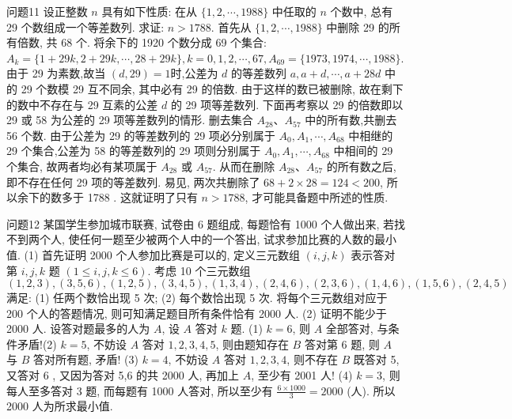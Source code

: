 问题11 设正整数 $n$ 具有如下性质: 在从 $\{1,2, \cdots, 1988\}$ 中任取的 $n$ 个数中, 总有 29 个数组成一个等差数列.
求证: $n>1788$.
首先从 $\{1,2, \cdots, 1988\}$ 中删除 29 的所有倍数, 共 68 个.
将余下的 1920 个数分成 69 个集合: $A_k=\{1+29 k, 2+29 k, \cdots, 28+29 k\}, k=0,1,2, \cdots, 67, A_{69}=\{1973,1974, \cdots, 1988\}$. 由于 29 为素数,故当 $(d, 29)=1 $时,公差为 $d$ 的等差数列 $a, a+d, \cdots, a+28 d$ 中的 29 个数模 29 互不同余, 其中必有 29 的倍数.
由于这样的数已被删除, 故在剩下的数中不存在与 29 互素的公差 $d$ 的 29 项等差数列.
下面再考察以 29 的倍数即以 29 或 58 为公差的 29 项等差数列的情形.
删去集合 $A_{28} 、 A_{57}$ 中的所有数,共删去 56 个数.
由于公差为 29 的等差数列的 29 项必分别属于 $A_0, A_1, \cdots, A_{68}$ 中相继的 29 个集合,公差为 58 的等差数列的 29 项则分别属于 $A_0, A_1, \cdots, A_{68}$ 中相间的 29 个集合, 故两者均必有某项属于 $A_{28}$ 或 $A_{57}$. 从而在删除 $A_{28} 、 A_{57}$ 的所有数之后, 即不存在任何 29 项的等差数列.
易见, 两次共删除了 $68+2 \times 28=124<200$, 所以余下的数多于 1788 . 这就证明了只有 $n>1788$, 才可能具备题中所述的性质.



问题12 某国学生参加城市联赛, 试卷由 6 题组成, 每题恰有 1000 个人做出来, 若找不到两个人, 使任何一题至少被两个人中的一个答出, 试求参加比赛的人数的最小值.
(1) 首先证明 2000 个人参加比赛是可以的, 定义三元数组 $(i, j, k)$ 表示答对第 $i, j, k$ 题 $(1 \leqslant i, j, k \leqslant 6)$. 考虑 10 个三元数组 $(1,2,3),(3,5,6),(1,2,5),(3,4,5),(1,3,4),(2,4,6),(2,3,6),(1,4,6),(1,5,6),(2,4,5)$ 满足: (1) 任两个数恰出现 5 次; (2) 每个数恰出现 5 次.
将每个三元数组对应于 200 个人的答题情况, 则可知满足题目所有条件恰有 2000 人.
(2) 证明不能少于 2000 人.
设答对题最多的人为 $A$, 设 $A$ 答对 $k$ 题.
(1) $k=6$, 则 $A$ 全部答对, 与条件矛盾!(2) $k=5$, 不妨设 $A$ 答对 $1,2,3,4,5$, 则由题知存在 $B$ 答对第 6 题, 则 $A$ 与 $B$ 答对所有题, 矛盾! (3) $k=4$, 不妨设 $A$ 答对 $1,2,3,4$, 则不存在 $B$ 既答对 5, 又答对 6 , 又因为答对 5,6 的共 2000 人, 再加上 $A$, 至少有 2001 人! (4) $k=3$, 则每人至多答对 3 题, 而每题有 1000 人答对, 所以至少有 $\frac{6 \times 1000}{3}=2000$ (人). 所以 2000 人为所求最小值.



